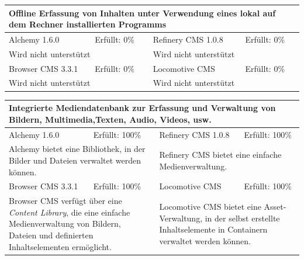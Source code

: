 \begin{tabular}[!ht]{|l|l|l|l|}
\hline
\multicolumn{4}{|p{15cm}|}{\textbf{Offline Erfassung von Inhalten unter Verwendung eines lokal auf dem Rechner installierten Programms}} \\
\hline
  Alchemy 1.6.0 & \cellcolor{red}Erfüllt: 0\% & Refinery CMS 1.0.8 & \cellcolor{red}Erfüllt: 0\% \\
  \hline
  \multicolumn{2}{|p{7.5cm}|}{Wird nicht unterstützt} & \multicolumn{2}{p{7.5cm}|}{Wird nicht unterstützt} \\
  \hline
  Browser CMS 3.3.1 & \cellcolor{red}Erfüllt: 0\% & Locomotive CMS & \cellcolor{red}Erfüllt: 0\% \\
  \hline
  \multicolumn{2}{|p{7.5cm}|}{Wird nicht unterstützt} & \multicolumn{2}{p{7.5cm}|}{Wird nicht unterstützt} \\
\hline
\end{tabular}
\newline
\newline
\newline
\begin{tabular}[!ht]{|l|l|l|l|}
\hline
\multicolumn{4}{|p{15cm}|}{\textbf{Integrierte Mediendatenbank zur Erfassung und Verwaltung von Bildern, Multimedia,Texten, Audio, Videos, usw.}} \\
\hline
  Alchemy 1.6.0 & \cellcolor{green}Erfüllt: 100\% & Refinery CMS 1.0.8 & \cellcolor{green}Erfüllt: 100\% \\
  \hline
  \multicolumn{2}{|p{7.5cm}|}{Alchemy bietet eine Bibliothek, in der Bilder und Dateien verwaltet werden können.}
   & \multicolumn{2}{p{7.5cm}|}{Refinery CMS bietet eine einfache Medienverwaltung.} \\
  \hline
  Browser CMS 3.3.1 & \cellcolor{green}Erfüllt: 100\% & Locomotive CMS & \cellcolor{green}Erfüllt: 100\% \\
  \hline
  \multicolumn{2}{|p{7.5cm}|}{Browser CMS verfügt über eine \emph {Content Library}, die eine einfache Medienverwaltung von Bildern, Dateien und definierten Inhaltselementen ermöglicht.} & \multicolumn{2}{p{7.5cm}|}{Locomotive CMS bietet eine Asset-Verwaltung, in der selbst erstellte Inhaltselemente in Containern verwaltet werden können.} \\
\hline
\end{tabular}
\newline
\newline
\newline
